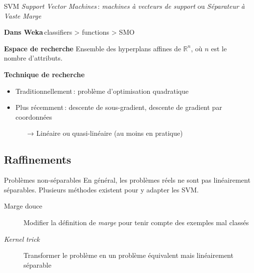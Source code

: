 \documentclass[../allslides.tex]{subfiles}
\begin{document}
\begin{frame}{SVM}
    \emph{Support Vector Machines} : \emph{machines à vecteurs de support} ou \emph{Séparateur à Vaste Marge}

    \textbf{Dans Weka} classifiers > functions > SMO
    \pause

    \textbf{Espace de recherche} Ensemble des hyperplans affines de $ℝ^n$, où $n$ est le nombre d'attributs.
    \pause

    \textbf{Technique de recherche}
    \begin{itemize}
        \item Traditionnellement : problème d'optimisation quadratique
        \item Plus récemment : descente de sous-gradient, descente de gradient par coordonnées
        \begin{itemize}
            \item[→] Linéaire ou quasi-linéaire (au moins en pratique)
        \end{itemize}
    \end{itemize}
\end{frame}


\subsection{Raffinements}
\begin{frame}{Problèmes non-séparables}
    En général, les problèmes réels ne sont pas linéairement séparables.
    Plusieurs méthodes existent pour y adapter les SVM.
    \begin{description}
        \item[Marge douce] Modifier la définition de \emph{marge} pour tenir compte des exemples mal classés
        \item[\emph{Kernel trick}] Transformer le problème en un problème équivalent mais linéairement séparable
    \end{description}
\end{frame}
\end{document}
